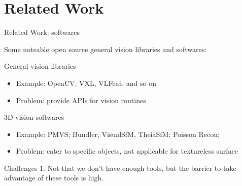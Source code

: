 \documentclass[10pt]{beamer}
\begin{document}
\section{Related Work}
\begin{frame}{Related Work: softwares}

Some noteable open source general vision libraries and softwares:

\begin{exampleblock}{General vision libraries}
\begin{itemize}
  \item Example: OpenCV, VXL, VLFeat, and so on
  \item Problem: provide APIs for vision routines
\end{itemize}
\end{exampleblock}

\begin{exampleblock}{3D vision softwares}
  \begin{itemize}
    \item Example: PMVS; Bundler, VisualSfM, TheiaSfM; Poisson Recon;
    \item Problem: cater to specific objects, not applicable for textureless surface
  \end{itemize}
\end{exampleblock}

\begin{alertblock}{Challenges}
1. Not that we don't have enough tools, but the barrier to take advantage of these tools is high. \\
\end{alertblock}

\end{frame}
\end{document}
